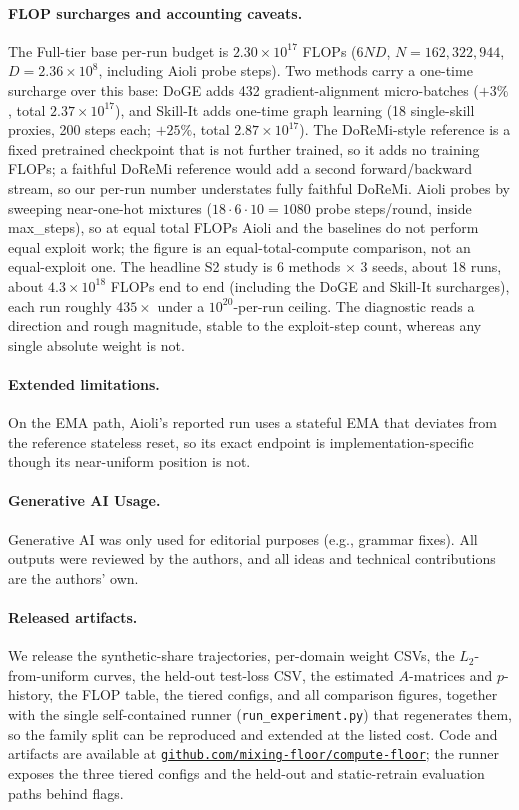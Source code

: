 \documentclass{article}
\newcommand{\repolink}{\href{https://github.com/mixing-floor/compute-floor}{\texttt{github.com/mixing-floor/compute-floor}}}
\begin{document}
\paragraph{FLOP surcharges and accounting caveats.} The Full-tier base per-run budget is $2.30\times10^{17}$ FLOPs ($6ND$, $N=162{,}322{,}944$, $D=2.36\times10^{8}$, including Aioli probe steps). Two methods carry a one-time surcharge over this base: DoGE adds 432 gradient-alignment micro-batches ($+3\%$, total $2.37\times10^{17}$), and Skill-It adds one-time graph learning (18 single-skill proxies, 200 steps each; $+25\%$, total $2.87\times10^{17}$). The DoReMi-style reference is a fixed pretrained checkpoint that is not further trained, so it adds no training FLOPs; a faithful DoReMi reference would add a second forward/backward stream, so our per-run number understates fully faithful DoReMi. Aioli probes by sweeping near-one-hot mixtures ($18\cdot6\cdot10 = 1080$ probe steps/round, inside max\_steps), so at equal total FLOPs Aioli and the baselines do not perform equal exploit work; the figure is an equal-total-compute comparison, not an equal-exploit one. The headline S2 study is 6 methods $\times$ 3 seeds, about 18 runs, about $4.3\times10^{18}$ FLOPs end to end (including the DoGE and Skill-It surcharges), each run roughly $435\times$ under a $10^{20}$-per-run ceiling. The diagnostic reads a direction and rough magnitude, stable to the exploit-step count, whereas any single absolute weight is not.

\paragraph{Extended limitations.} On the EMA path, Aioli's reported run uses a stateful EMA that deviates from the reference stateless reset, so its exact endpoint is implementation-specific though its near-uniform position is not.

\paragraph{Generative AI Usage.} Generative AI was only used for editorial purposes (e.g., grammar fixes). All outputs were reviewed by the authors, and all ideas and technical contributions are the authors’ own.

\paragraph{Released artifacts.} We release the synthetic-share trajectories, per-domain weight CSVs, the $L_2$-from-uniform curves, the held-out test-loss CSV, the estimated $A$-matrices and $p$-history, the FLOP table, the tiered configs, and all comparison figures, together with the single self-contained runner (\texttt{run\_experiment.py}) that regenerates them, so the family split can be reproduced and extended at the listed cost. Code and artifacts are available at \repolink; the runner exposes the three tiered configs and the held-out and static-retrain evaluation paths behind flags.
\end{document}
